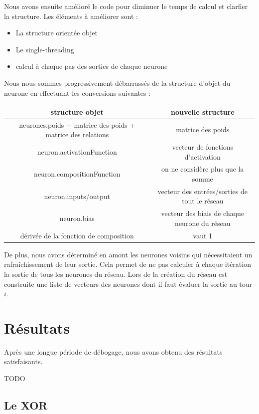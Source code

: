 Nous avons ensuite amélioré le code pour diminuer le temps de calcul et clarfier
la structure. Les éléments à améliorer sont :
\begin{itemize}
\item La structure orientée objet
\item Le single-threading
\item calcul à chaque pas des sorties de chaque neurone
\end{itemize}

\medskip

Nous nous sommes progressivement débarrassés de la structure d'objet du neurone
en effectuant les conversions suivantes :

\medskip

\begin{tabular}{c|c}
   structure objet & nouvelle structure \\
   \hline
   neurones.poids + matrice des poids + matrice des relations & matrice des poids \\
   neuron.activationFunction & vecteur de fonctions d'activation \\
   neuron.compositionFunction & on ne considère plus que la somme \\
   neuron.inputs/output & vecteur des entrées/sorties de tout le réseau \\
   neuron.bias & vecteur des biais de chaque neurone du réseau \\
   dérivée de la fonction de composition & vaut 1
\end{tabular}

\medskip

De plus, nous avons déterminé en amont les neurones voisins qui nécessitaient
un rafraîchissement de leur sortie. Cela permet de ne pas calculer à chaque
itération la sortie de tous les neurones du réseau. Lors de la création du
réseau est construite une liste de vecteurs des neurones dont il faut évaluer
la sortie au tour $i$.

\section{Résultats}

Après une longue période de débogage, nous avons obtenu des résultats
satisfaisants.

TODO

\subsection{Le XOR}

